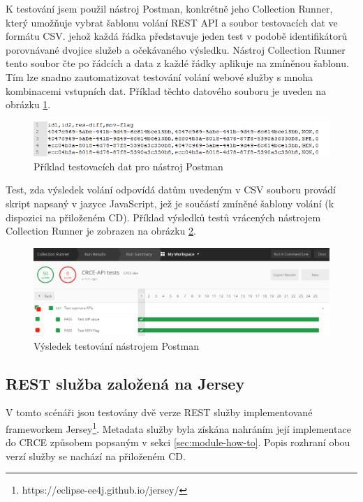 \documentclass[czech,DP]{thesiskiv}
\begin{document}
K testování jsem použil nástroj Postman, konkrétně jeho Collection Runner, který umožňuje vybrat šablonu volání REST API a soubor testovacích dat ve formátu CSV. jehož každá řádka představuje jeden test v podobě identifikátorů porovnávané dvojice služeb a očekávaného výsledku. Nástroj Collection Runner tento soubor čte po řádcích a data z každé řádky aplikuje na zmíněnou šablonu. Tím lze snadno zautomatizovat testování volání webové služby s mnoha kombinacemi vstupních dat. Příklad těchto datového souboru je uveden na obrázku \ref{fig:test-data-csv}. 

\begin{figure}[h]
	\centering
	\includegraphics[width=\linewidth]{test-data-csv.png}
	\caption{Příklad testovacích dat pro nástroj Postman}
	\label{fig:test-data-csv}
\end{figure}

Test, zda výsledek volání odpovídá datům uvedeným v CSV souboru provádí skript napsaný v jazyce JavaScript, jež je součástí zmíněné šablony volání (k dispozici na přiloženém CD). Příklad výsledků testů vrácených nástrojem Collection Runner je zobrazen na obrázku \ref{fig:test-results}.

\begin{figure}[h]
	\centering
	\includegraphics[width=\linewidth]{test-results.png}
	\caption{Výsledek testování nástrojem Postman}
	\label{fig:test-results}
\end{figure}


\subsection{REST služba založená na Jersey}

V tomto scénáři jsou testovány dvě verze REST služby implementované frameworkem Jersey\footnote{https://eclipse-ee4j.github.io/jersey/}. Metadata služby byla získána nahráním její implementace do CRCE způsobem popsaným v sekci \ref{sec:module-how-to}. Popis rozhraní obou verzí služby se nachází na přiloženém CD.  
\end{document}
